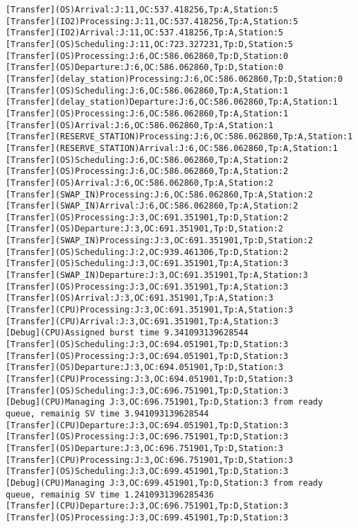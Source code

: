 \documentclass[12pt,a4paper]{article}
\begin{document}
\begin{lstlisting}
[Transfer](OS)Arrival:J:11,OC:537.418256,Tp:A,Station:5
[Transfer](IO2)Processing:J:11,OC:537.418256,Tp:A,Station:5
[Transfer](IO2)Arrival:J:11,OC:537.418256,Tp:A,Station:5
[Transfer](OS)Scheduling:J:11,OC:723.327231,Tp:D,Station:5
[Transfer](OS)Processing:J:6,OC:586.062860,Tp:D,Station:0
[Transfer](OS)Departure:J:6,OC:586.062860,Tp:D,Station:0
[Transfer](delay_station)Processing:J:6,OC:586.062860,Tp:D,Station:0
[Transfer](OS)Scheduling:J:6,OC:586.062860,Tp:A,Station:1
[Transfer](delay_station)Departure:J:6,OC:586.062860,Tp:A,Station:1
[Transfer](OS)Processing:J:6,OC:586.062860,Tp:A,Station:1
[Transfer](OS)Arrival:J:6,OC:586.062860,Tp:A,Station:1
[Transfer](RESERVE_STATION)Processing:J:6,OC:586.062860,Tp:A,Station:1
[Transfer](RESERVE_STATION)Arrival:J:6,OC:586.062860,Tp:A,Station:1
[Transfer](OS)Scheduling:J:6,OC:586.062860,Tp:A,Station:2
[Transfer](OS)Processing:J:6,OC:586.062860,Tp:A,Station:2
[Transfer](OS)Arrival:J:6,OC:586.062860,Tp:A,Station:2
[Transfer](SWAP_IN)Processing:J:6,OC:586.062860,Tp:A,Station:2
[Transfer](SWAP_IN)Arrival:J:6,OC:586.062860,Tp:A,Station:2
[Transfer](OS)Processing:J:3,OC:691.351901,Tp:D,Station:2
[Transfer](OS)Departure:J:3,OC:691.351901,Tp:D,Station:2
[Transfer](SWAP_IN)Processing:J:3,OC:691.351901,Tp:D,Station:2
[Transfer](OS)Scheduling:J:2,OC:939.461306,Tp:D,Station:2
[Transfer](OS)Scheduling:J:3,OC:691.351901,Tp:A,Station:3
[Transfer](SWAP_IN)Departure:J:3,OC:691.351901,Tp:A,Station:3
[Transfer](OS)Processing:J:3,OC:691.351901,Tp:A,Station:3
[Transfer](OS)Arrival:J:3,OC:691.351901,Tp:A,Station:3
[Transfer](CPU)Processing:J:3,OC:691.351901,Tp:A,Station:3
[Transfer](CPU)Arrival:J:3,OC:691.351901,Tp:A,Station:3
[Debug](CPU)Assigned burst time 9.341093139628544
[Transfer](OS)Scheduling:J:3,OC:694.051901,Tp:D,Station:3
[Transfer](OS)Processing:J:3,OC:694.051901,Tp:D,Station:3
[Transfer](OS)Departure:J:3,OC:694.051901,Tp:D,Station:3
[Transfer](CPU)Processing:J:3,OC:694.051901,Tp:D,Station:3
[Transfer](OS)Scheduling:J:3,OC:696.751901,Tp:D,Station:3
[Debug](CPU)Managing J:3,OC:696.751901,Tp:D,Station:3 from ready queue, remainig SV time 3.941093139628544
[Transfer](CPU)Departure:J:3,OC:694.051901,Tp:D,Station:3
[Transfer](OS)Processing:J:3,OC:696.751901,Tp:D,Station:3
[Transfer](OS)Departure:J:3,OC:696.751901,Tp:D,Station:3
[Transfer](CPU)Processing:J:3,OC:696.751901,Tp:D,Station:3
[Transfer](OS)Scheduling:J:3,OC:699.451901,Tp:D,Station:3
[Debug](CPU)Managing J:3,OC:699.451901,Tp:D,Station:3 from ready queue, remainig SV time 1.2410931396285436
[Transfer](CPU)Departure:J:3,OC:696.751901,Tp:D,Station:3
[Transfer](OS)Processing:J:3,OC:699.451901,Tp:D,Station:3

\end{lstlisting}
\end{document}
